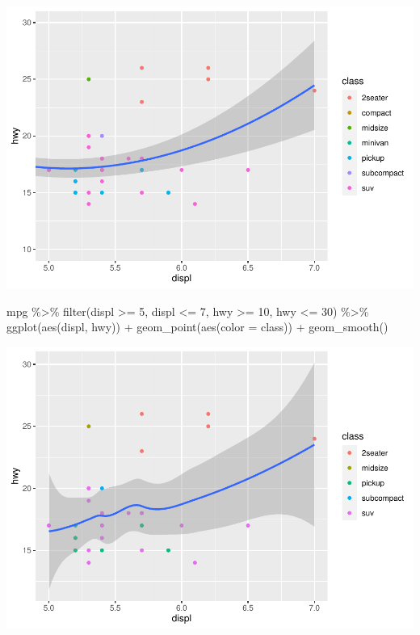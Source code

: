 \documentclass[
]{article}
\newenvironment{Shaded}{\begin{snugshade}}{\end{snugshade}}
\newcommand{\AttributeTok}[1]{\textcolor[rgb]{0.77,0.63,0.00}{#1}}
\newcommand{\DecValTok}[1]{\textcolor[rgb]{0.00,0.00,0.81}{#1}}
\newcommand{\FunctionTok}[1]{\textcolor[rgb]{0.00,0.00,0.00}{#1}}
\newcommand{\NormalTok}[1]{#1}
\newcommand{\SpecialCharTok}[1]{\textcolor[rgb]{0.00,0.00,0.00}{#1}}
\begin{document}
\includegraphics{Journal_files/figure-latex/unnamed-chunk-67-1.pdf}

\begin{Shaded}
\begin{Highlighting}[]
\NormalTok{mpg }\SpecialCharTok{\%\textgreater{}\%}
  \FunctionTok{filter}\NormalTok{(displ }\SpecialCharTok{\textgreater{}=} \DecValTok{5}\NormalTok{, displ }\SpecialCharTok{\textless{}=} \DecValTok{7}\NormalTok{, hwy }\SpecialCharTok{\textgreater{}=} \DecValTok{10}\NormalTok{, hwy }\SpecialCharTok{\textless{}=} \DecValTok{30}\NormalTok{) }\SpecialCharTok{\%\textgreater{}\%}
  \FunctionTok{ggplot}\NormalTok{(}\FunctionTok{aes}\NormalTok{(displ, hwy)) }\SpecialCharTok{+}
  \FunctionTok{geom\_point}\NormalTok{(}\FunctionTok{aes}\NormalTok{(}\AttributeTok{color =}\NormalTok{ class)) }\SpecialCharTok{+}
  \FunctionTok{geom\_smooth}\NormalTok{()}
\end{Highlighting}
\end{Shaded}

\includegraphics{Journal_files/figure-latex/unnamed-chunk-67-2.pdf}
\end{document}
